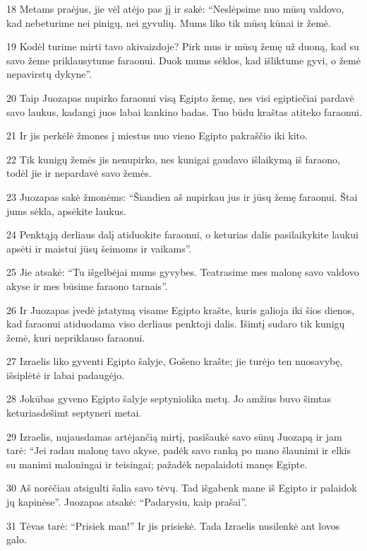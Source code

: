 \par 18 Metams praėjus, jie vėl atėjo pas jį ir sakė: “Neslėpsime nuo mūsų valdovo, kad nebeturime nei pinigų, nei gyvulių. Mums liko tik mūsų kūnai ir žemė. 
\par 19 Kodėl turime mirti tavo akivaizdoje? Pirk mus ir mūsų žemę už duoną, kad su savo žeme priklausytume faraonui. Duok mums sėklos, kad išliktume gyvi, o žemė nepavirstų dykyne”. 
\par 20 Taip Juozapas nupirko faraonui visą Egipto žemę, nes visi egiptiečiai pardavė savo laukus, kadangi juos labai kankino badas. Tuo būdu kraštas atiteko faraonui. 
\par 21 Ir jis perkėlė žmones į miestus nuo vieno Egipto pakraščio iki kito. 
\par 22 Tik kunigų žemės jis nenupirko, nes kunigai gaudavo išlaikymą iš faraono, todėl jie ir nepardavė savo žemės. 
\par 23 Juozapas sakė žmonėms: “Šiandien aš nupirkau jus ir jūsų žemę faraonui. Štai jums sėkla, apsėkite laukus. 
\par 24 Penktąją derliaus dalį atiduokite faraonui, o keturias dalis pasilaikykite laukui apsėti ir maistui jūsų šeimoms ir vaikams”. 
\par 25 Jie atsakė: “Tu išgelbėjai mums gyvybes. Teatrasime mes malonę savo valdovo akyse ir mes būsime faraono tarnais”. 
\par 26 Ir Juozapas įvedė įstatymą visame Egipto krašte, kuris galioja iki šios dienos, kad faraonui atiduodama viso derliaus penktoji dalis. Išimtį sudaro tik kunigų žemė, kuri nepriklauso faraonui. 
\par 27 Izraelis liko gyventi Egipto šalyje, Gošeno krašte; jie turėjo ten nuosavybę, išsiplėtė ir labai padaugėjo. 
\par 28 Jokūbas gyveno Egipto šalyje septyniolika metų. Jo amžius buvo šimtas keturiasdešimt septyneri metai. 
\par 29 Izraelis, nujausdamas artėjančią mirtį, pasišaukė savo sūnų Juozapą ir jam tarė: “Jei radau malonę tavo akyse, padėk savo ranką po mano šlaunimi ir elkis su manimi maloningai ir teisingai; pažadėk nepalaidoti manęs Egipte. 
\par 30 Aš norėčiau atsigulti šalia savo tėvų. Tad išgabenk mane iš Egipto ir palaidok jų kapinėse”. Juozapas atsakė: “Padarysiu, kaip prašai”. 
\par 31 Tėvas tarė: “Prisiek man!” Ir jis prisiekė. Tada Izraelis nusilenkė ant lovos galo.



